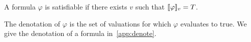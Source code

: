 A formula $\varphi$ is satisfiable if there exists $v$ such that $[\![\varphi]\!]_v = T$.

The denotation of $\varphi$ is the set of valuations for which $\varphi$ evaluates to true. We give the denotation of a formula in~\autoref{app:denote}.







